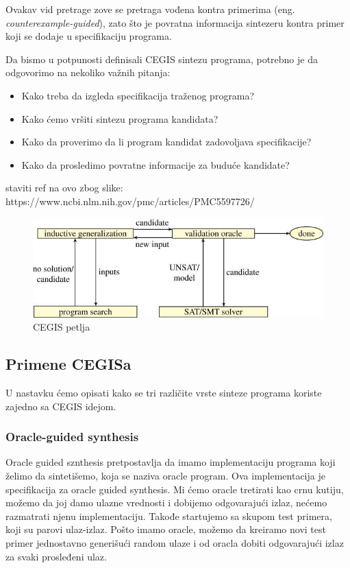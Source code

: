 Ovakav vid pretrage zove se pretraga vođena kontra primerima (eng. \emph{counterexample-guided}), zato što je povratna informacija sintezeru kontra primer koji se dodaje u specifikaciju programa. 

Da bismo u potpunosti definisali CEGIS sintezu programa, potrebno je da odgovorimo na nekoliko važnih pitanja:

\begin{itemize}
  \item Kako treba da izgleda specifikacija traženog programa?
  \item Kako ćemo vršiti sintezu programa kandidata?
  \item Kako da proverimo da li program kandidat zadovoljava specifikacije?
  \item Kako da prosledimo povratne informacije za buduće kandidate?
\end{itemize}

staviti ref na ovo zbog slike: https://www.ncbi.nlm.nih.gov/pmc/articles/PMC5597726/


\begin{figure}[h!]
\begin{center}
\includegraphics[scale=0.4]{resources/cegis.jpeg}
\end{center}
\caption{CEGIS petlja}
\label{fig:cegis}
\end{figure}


\subsection{Primene CEGISa}
\label{subsec:primeneCEGISa}

U nastavku ćemo opisati kako se tri različite vrste sinteze programa koriste zajedno sa CEGIS idejom.

\subsubsection{Oracle-guided synthesis}
\label{subsec:oracleGuidedSynthesis}

Oracle guided sznthesis pretpostavlja da imamo implementaciju programa koji želimo da sintetišemo, koja se naziva oracle program. Ova implementacija je specifikacija za oracle guided synthesis. Mi ćemo oracle tretirati kao crnu kutiju, možemo da joj damo ulazne vrednosti i dobijemo odgovarajući izlaz, nećemo razmatrati njenu implementaciju. Takođe startujemo sa skupom test primera, koji su parovi ulaz-izlaz. Pošto imamo oracle, možemo da kreiramo novi test primer jednostavno generišući random ulaze i od oracla dobiti odgovarajući izlaz za svaki prosleđeni ulaz.

